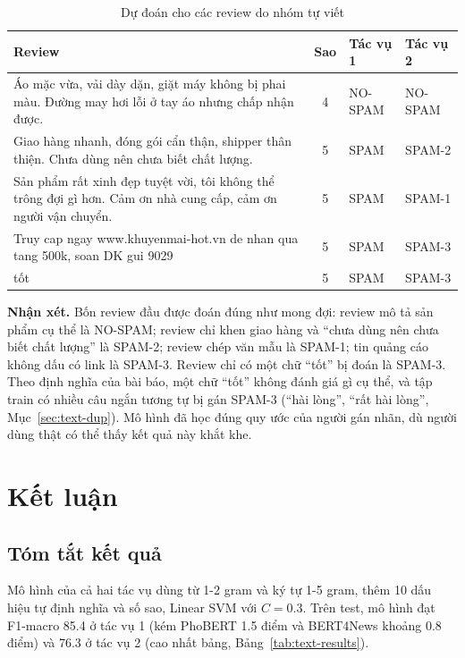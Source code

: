 \begin{table}[H]
\centering
\caption{Dự đoán cho các review do nhóm tự viết}
\label{tab:text-new}
\small
\begin{tabular}{>{\raggedright\arraybackslash}p{8.6cm}c>{\raggedright\arraybackslash}p{1.6cm}>{\raggedright\arraybackslash}p{2.6cm}}
\toprule
Review & Sao & Tác vụ 1 & Tác vụ 2\\
\midrule
Áo mặc vừa, vải dày dặn, giặt máy không bị phai màu. Đường may hơi lỗi ở tay áo nhưng chấp nhận được. & 4 & NO-SPAM & NO-SPAM\\
Giao hàng nhanh, đóng gói cẩn thận, shipper thân thiện. Chưa dùng nên chưa biết chất lượng. & 5 & SPAM & SPAM-2\\
Sản phẩm rất xinh đẹp tuyệt vời, tôi không thể trông đợi gì hơn. Cảm ơn nhà cung cấp, cảm ơn người vận chuyển. & 5 & SPAM & SPAM-1\\
Truy cap ngay www.khuyenmai-hot.vn de nhan qua tang 500k, soan DK gui 9029 & 5 & SPAM & SPAM-3\\
tốt & 5 & SPAM & SPAM-3\\
\bottomrule
\end{tabular}
\end{table}

\textbf{Nhận xét.} Bốn review đầu được đoán đúng như mong đợi: review mô tả sản phẩm cụ thể là NO-SPAM; review chỉ khen giao hàng và ``chưa dùng nên chưa biết chất lượng'' là SPAM-2; review chép văn mẫu là SPAM-1; tin quảng cáo không dấu có link là SPAM-3. Review chỉ có một chữ ``tốt'' bị đoán là SPAM-3. Theo định nghĩa của bài báo, một chữ ``tốt'' không đánh giá gì cụ thể, và tập train có nhiều câu ngắn tương tự bị gán SPAM-3 (``hài lòng'', ``rất hài lòng'', Mục~\ref{sec:text-dup}). Mô hình đã học đúng quy ước của người gán nhãn, dù người dùng thật có thể thấy kết quả này khắt khe.

\section{Kết luận}

\subsection{Tóm tắt kết quả}
Mô hình của cả hai tác vụ dùng từ 1-2 gram và ký tự 1-5 gram, thêm 10 dấu hiệu tự định nghĩa và số sao, Linear SVM với $C = 0.3$.
Trên test, mô hình đạt F1-macro 85.4 ở tác vụ 1 (kém PhoBERT 1.5 điểm và BERT4News khoảng 0.8 điểm) và 76.3 ở tác vụ 2 (cao nhất bảng, Bảng~\ref{tab:text-results}).

